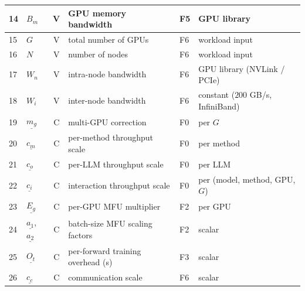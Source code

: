 \begin{table}[!h]
\begin{tabular}{@{}l l c l l l@{}}
  14 & $B_m$          & V & GPU memory bandwidth                      & F5                & GPU library \\
  \midrule
  15 & $G$            & V & total number of GPUs                      & F6                & workload input \\
  16 & $N$            & V & number of nodes                           & F6                & workload input \\
  17 & $W_n$          & V & intra-node bandwidth                      & F6                & GPU library (NVLink / PCIe) \\
  18 & $W_i$          & V & inter-node bandwidth                      & F6                & constant ($200$ GB/s, InfiniBand) \\
  \midrule
  \midrule
  19 & $\underline{m_g}$          & C & multi-GPU correction                      & F0                & per $G$ \\
  20 & $\underline{c_m}$          & C & per-method throughput scale               & F0                & per method \\
  21 & $\underline{c_o}$          & C & per-LLM throughput scale                  & F0                & per LLM \\
  22 & $\underline{c_i}$          & C & interaction throughput scale              & F0                & per (model, method, GPU, $G$) \\
  \midrule
  23 & $\underline{E_g}$          & C & per-GPU MFU multiplier                    & F2                & per GPU \\
  24 & $\underline{a_1}$, $\underline{a_2}$   & C & batch-size MFU scaling factors            & F2                & scalar \\
  \midrule
  25 & $\underline{O_t}$          & C & per-forward training overhead (s)         & F3                & scalar \\
  \midrule
  26 & $\underline{c_c}$          & C & communication scale                       & F6                & scalar \\
  \bottomrule
  \end{tabular}
  \end{table}

